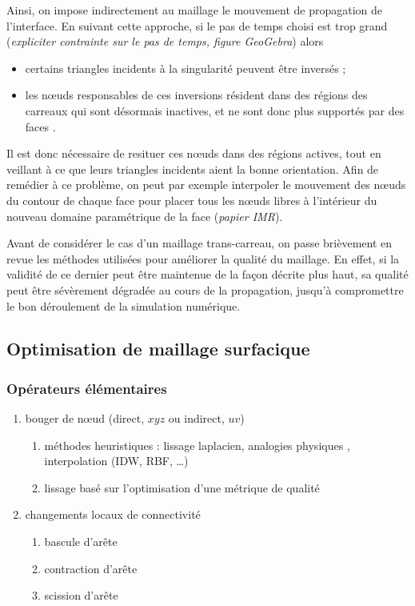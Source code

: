 Ainsi, on impose indirectement au maillage le mouvement de propagation de l'interface. 
%
En suivant cette approche, si le pas de temps choisi est trop grand (\textit{expliciter contrainte sur le pas de temps, \cf figure GeoGebra}) alors 
\begin{itemize}
	\item certains triangles incidents à la singularité peuvent être inversés ;
	\item les n\oe uds responsables de ces inversions résident dans des régions des carreaux qui sont désormais inactives, et ne sont donc plus supportés par des faces \brep.
\end{itemize}

Il est donc nécessaire de resituer ces n\oe uds dans des régions actives, tout en veillant à ce que leurs triangles incidents aient la bonne orientation. 
Afin de remédier à ce problème, on peut par exemple interpoler le mouvement des n\oe uds du contour de chaque face pour placer tous les n\oe uds libres à l'intérieur du nouveau domaine paramétrique de la face (\textit{\cf papier IMR}).
\par
Avant de considérer le cas d'un maillage trans-carreau, on passe brièvement en revue les méthodes utilisées pour améliorer la qualité du maillage. 
En effet, si la validité de ce dernier peut être maintenue de la façon décrite plus haut, sa qualité peut être sévèrement dégradée au cours de la propagation, jusqu'à compromettre le bon déroulement de la simulation numérique.


\subsection{Optimisation de maillage surfacique}


\subsubsection{Opérateurs élémentaires}
\begin{enumerate}
	\item bouger de n\oe ud (direct, \ie $xyz$ ou indirect, \ie $uv$)
	\begin{enumerate}
		\item méthodes heuristiques : lissage laplacien, analogies physiques \cite{farhat1998}, interpolation (IDW, RBF, \ldots)
		\item lissage basé sur l'optimisation d'une métrique de qualité \cite{freitag1995, canann1998, jiao2008, gargallo2014}
	\end{enumerate}
	\item changements locaux de connectivité
	\begin{enumerate}
		\item bascule d'arête
		\item contraction d'arête
		\item scission d'arête
	\end{enumerate}
\end{enumerate}

